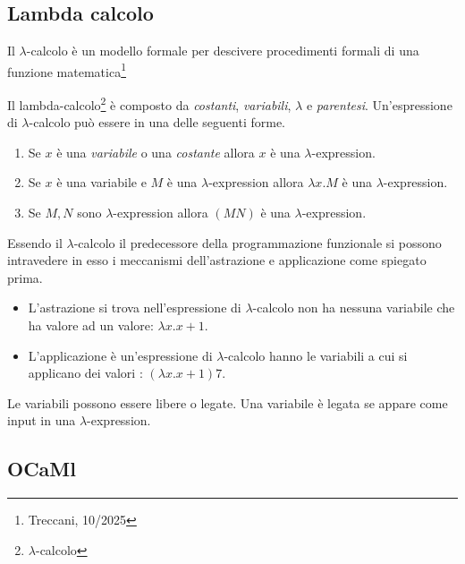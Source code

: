 \documentclass{article}
\begin{document}
\subsection{Lambda calcolo} 

\hspace*{0.5cm} Il $\lambda$-calcolo è un modello formale per descivere procedimenti formali di una funzione matematica\footnote{Treccani, 10/2025}

\hspace*{0.5cm}Il lambda-calcolo\footnote{$\lambda$-calcolo} è composto da \textit{costanti}, \textit{variabili}, \textit{$\lambda$} e \textit{parentesi}. 
Un'espressione di $\lambda$-calcolo può essere in una delle seguenti forme. 
\begin{enumerate}[itemsep=0mm]
  \item Se $x$ è una \textit{variabile} o una \textit{costante} allora $x$ è una $\lambda$-expression.
  \item Se $x$ è una variabile e $M$ è una $\lambda$-expression allora $\lambda x.M$ è una $\lambda$-expression.
  \item Se $M,N$ sono $\lambda$-expression allora $(MN)$ è una $\lambda$-expression.
\end{enumerate}

\vspace*{0.5cm}

\hspace*{0.5cm} Essendo il $\lambda$-calcolo il predecessore della programmazione funzionale si possono intravedere in esso i meccanismi dell'astrazione e applicazione come spiegato prima.
\begin{itemize}
  \item L'astrazione si trova nell'espressione di $\lambda$-calcolo non ha nessuna variabile che ha valore ad un valore: $\lambda x.x + 1$. 
  \item L'applicazione è un'espressione di $\lambda$-calcolo hanno le variabili a cui si applicano dei valori : $(\lambda x.x + 1)7$.
\end{itemize}

\vspace*{0.5cm}

\hspace*{0.5cm}Le variabili possono essere libere o legate.
Una variabile è legata se appare come input in una $\lambda$-expression.

\subsection{OCaMl}
\end{document}
